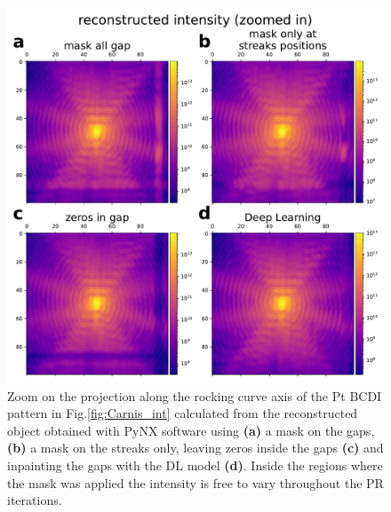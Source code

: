 \begin{figure}[H]
    \centering
    \includegraphics[width=\textwidth]{figures/Inpainting/reconstructed_intensity_zoom_jerome.pdf}
    \caption{Zoom on the projection along the rocking curve axis of the Pt BCDI pattern in Fig.\ref{fig:Carnis_int} 
    calculated from the reconstructed object obtained with PyNX software using \textbf{(a)} a mask on the gaps, 
    \textbf{(b)} a mask on the streaks only, leaving zeros inside the gaps \textbf{(c)} and inpainting the gaps with 
    the DL model \textbf{(d)}. Inside the regions where the mask was applied the intensity is free to vary throughout 
    the PR iterations. }
    \label{fig:high_res_Icalc}
\end{figure}

